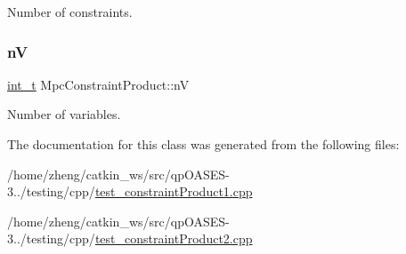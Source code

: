Number of constraints. \mbox{\label{class_mpc_constraint_product_a9ef5d7dbc63257619b9bd0ad947fe3cc}} 
\subsubsection{\texorpdfstring{nV}{nV}}
{\footnotesize\ttfamily \hyperlink{_types_8hpp_ab6fd6105e64ed14a0c9281326f05e623}{int\+\_\+t} Mpc\+Constraint\+Product\+::nV\hspace{0.3cm}{\ttfamily [protected]}}

Number of variables. 

The documentation for this class was generated from the following files\+:\begin{DoxyCompactItemize}
\item 
/home/zheng/catkin\+\_\+ws/src/qp\+O\+A\+S\+E\+S-\/3../testing/cpp/\hyperlink{test__constraint_product1_8cpp}{test\+\_\+constraint\+Product1.\+cpp}\item 
/home/zheng/catkin\+\_\+ws/src/qp\+O\+A\+S\+E\+S-\/3../testing/cpp/\hyperlink{test__constraint_product2_8cpp}{test\+\_\+constraint\+Product2.\+cpp}\end{DoxyCompactItemize}
